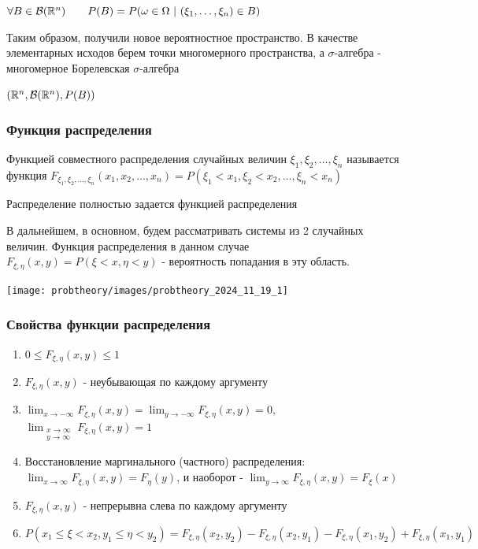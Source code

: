 \documentclass[12pt]{article}
\begin{document}
    $\forall B \in \mathcal{B}(\mathbb{R}^n) \qquad P(B) = P(\omega \in \Omega \ | \ (\xi_1, \dots, \xi_n) \in B)$

    Таким образом, получили новое вероятностное пространство. В качестве элементарных исходов берем точки многомерного пространства, 
    а $\sigma$-алгебра - многомерное Борелевская $\sigma$-алгебра

    $(\mathbb{R}^n, \mathcal{B}(\mathbb{R}^n), P(B))$

    \hypertarget{jointdistributionfunction}{}

    \subsubsection{Функция распределения}

    \Def Функцией совместного распределения случайных величин $\xi_1, \xi_2, \dots, \xi_n$ называется функция 
    $F_{\xi_1, \xi_2, \dots, \xi_n}(x_1, x_2, \dots, x_n) = P(\xi_1 < x_1, \xi_2 < x_2, \dots, \xi_n < x_n)$

    \Notas Распределение полностью задается функцией распределения

    \Nota В дальнейшем, в основном, будем рассматривать системы из 2 случайных величин. Функция распределения в данном случае $F_{\xi, \eta}(x, y) = P(\xi < x, \eta < y)$ - вероятность попадания в эту область.

    \begin{center}
        \texttt{[image: probtheory/images/probtheory\_2024\_11\_19\_1]}
    \end{center}

    \hypertarget{jointdistributionfunctionproperties}{}

    \subsubsection{Свойства функции распределения}

    \begin{enumerate}
        \item $0 \leq F_{\xi, \eta}(x, y) \leq 1$
        \item $F_{\xi, \eta}(x, y)$ - неубывающая по каждому аргументу
        \item $\lim_{x \to -\infty} F_{\xi, \eta}(x, y) = \lim_{y \to -\infty} F_{\xi, \eta}(x, y) = 0, $
        $\lim_{\substack{x \to \infty \\ y \to \infty}} F_{\xi, \eta}(x, y) = 1$

        \item Восстановление маргинального (частного) распределения: 
        $\lim_{x \to \infty} F_{\xi, \eta}(x, y) = F_\eta(y)$, и наоборот - $\lim_{y \to \infty} F_{\xi, \eta}(x, y) = F_\xi(x)$

        \item $F_{\xi, \eta}(x, y)$ - непрерывна слева по каждому аргументу

        \item $P(x_1 \leq \xi < x_2, y_1 \leq \eta < y_2) = F_{\xi, \eta}(x_2, y_2) - F_{\xi, \eta}(x_2, y_1) - F_{\xi, \eta}(x_1, y_2) + F_{\xi, \eta}(x_1, y_1)$
    \end{enumerate}
\end{document}
